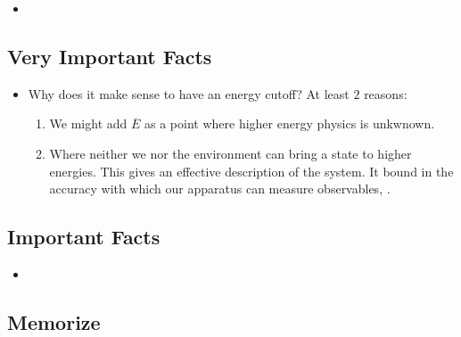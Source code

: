 \documentclass{article}
\newcommand{\cut}[1]{\overline{#1}}
\begin{document}
    \begin{itemize}

    \item 
    
    \end{itemize}

\subsection*{Very Important Facts}

    \begin{itemize}

    \item Why does it make sense to have an energy cutoff? At least $2$ reasons:
    
        \begin{enumerate}
            
        \item We might add $\cut E$ as a point where higher energy physics is unkwnown.
        
        \item Where neither we nor the environment can bring a state to higher energies. This gives an effective description of the system. It  bound in the accuracy with which our apparatus can measure observables, .
            
        \end{enumerate}
    
    \end{itemize}

\subsection*{Important Facts}

    \begin{itemize}

    \item 
    
    \end{itemize}

\subsection*{Memorize}
\end{document}
